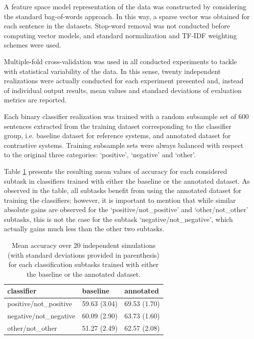 \documentclass[11pt]{elsarticle}
\begin{document}
A feature space model representation of the data was constructed by considering the standard bag-of-words approach.
In this way, a sparse vector was obtained for each sentence in the datasets. Stop-word removal was not
conducted before computing vector models, and standard normalization and TF-IDF weighting schemes were used.

Multiple-fold cross-validation was used in all conducted experiments to tackle with statistical variability of the
data. In this sense, twenty independent realizations were actually conducted for each experiment presented and,
instead of individual output results, mean values and standard deviations of evaluation metrics are reported.

Each binary classifier realization was trained with a random subsample set of 600 sentences extracted from
the training dataset corresponding to the classifier group, i.e. baseline dataset for reference systems,
and annotated dataset for contrastive systems. Training subsample sets were always balanced with respect to
the original three categories: `positive', `negative' and `other'.


Table \ref{table:tc_accu} presents the resulting mean values of accuracy for each considered subtask
in classifiers trained with either the baseline or the annotated dataset. As observed in the table,
all subtasks benefit from using the annotated dataset for training the classifiers; however, it is
important to mention that while similar absolute gains are observed for the `positive/not\_positive'
and `other/not\_other' subtasks, this is not the case for the subtask `negative/not\_negative',
which actually gains much less than the other two subtasks.

\begin{table}
\begin{center}
\begin{small}
\begin{tabular}{|l|l|l|}
\hline
classifier &baseline &annotated \\
\hline
positive/not\_positive &59.63 (3.04) &69.53 (1.70) \\
\hline
negative/not\_negative &60.09 (2.90) &63.73 (1.60) \\
\hline
other/not\_other &51.27 (2.49) &62.57 (2.08) \\
\hline
\end{tabular}
\end{small}
\caption{Mean accuracy over 20 independent simulations (with standard deviations provided in parenthesis)
for each classification subtasks trained with either the baseline or the annotated dataset.}
\label{table:tc_accu}
\end{center}
\end{table}
\end{document}

